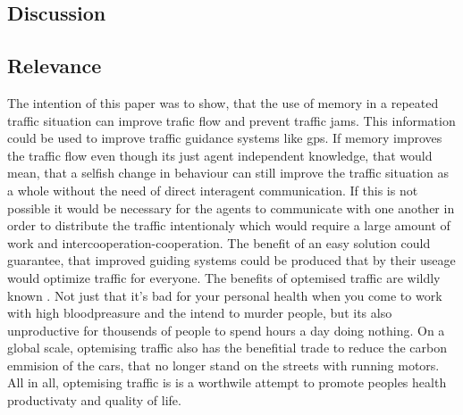 \documentclass[a4paper,hidelinks]{article}
\begin{document}
\subsection{Discussion}
\subsection{Relevance}
The intention of this paper was to show, that the use of memory in a repeated traffic situation can improve trafic flow and prevent traffic jams. This information could be used to improve traffic guidance systems like gps. If memory improves the traffic flow even though its just agent independent knowledge, that would mean, that a selfish change in behaviour can still improve the traffic situation as a whole without the need of direct interagent communication. If this is not possible it would be necessary for the agents to communicate with one another in order to distribute the traffic intentionaly which would require a large amount of work and intercooperation-cooperation. 
The benefit of an easy solution could guarantee, that improved guiding systems could be produced that by their useage would optimize traffic for everyone. 
The benefits of optemised traffic are wildly known \cite{french2003multiagnet}. Not just that it's bad for your personal health when you come to work with high bloodpreasure and the intend to murder people, but its also unproductive for thousends of people to spend hours a day doing nothing. On a global scale, optemising traffic also has the benefitial trade to reduce the carbon emmision of the cars, that no longer stand on the streets with running motors. 
All in all, optemising traffic is is a worthwile attempt to promote peoples health productivaty and quality of life. 



\end{document}
